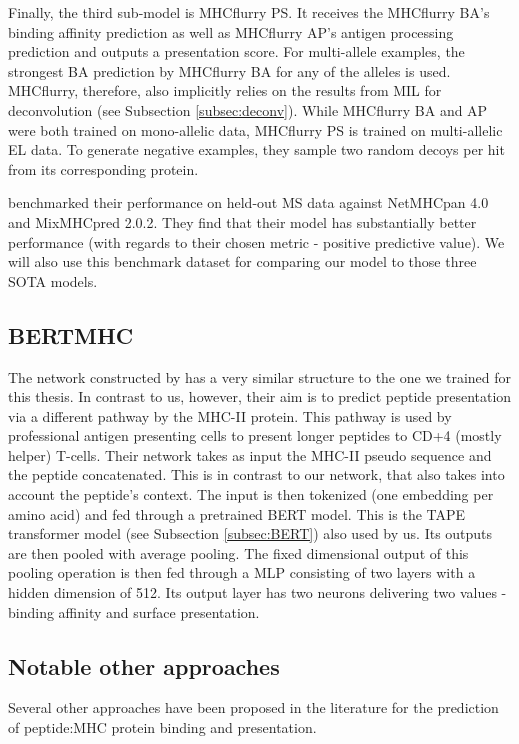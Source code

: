 \documentclass[msc,deptreport,ai]{infthesis} %
\begin{document}
	Finally, the third sub-model is MHCflurry PS. It receives the MHCflurry BA's binding affinity prediction as well as MHCflurry AP's antigen processing prediction and outputs a presentation score. For multi-allele examples, the strongest \gls{BA} prediction by MHCflurry BA for any of the alleles is used. MHCflurry, therefore, also implicitly relies on the results from \gls{MIL} for deconvolution (see Subsection \ref{subsec:deconv}). While MHCflurry BA and AP were both trained on mono-allelic data, MHCflurry PS is trained on multi-allelic \gls{EL} data. To generate negative examples, they sample two random decoys per hit from its corresponding protein.
	
	\cite{odonnell_mhcflurry_2020} benchmarked their performance on held-out MS data against NetMHCpan 4.0 and  MixMHCpred 2.0.2. They find that their model has substantially better performance (with regards to their chosen metric - positive predictive value). We will also use this benchmark dataset for comparing our model to those three \gls{SOTA} models. 
	
	\subsection{BERTMHC}
	\label{subsec:BERTMHC}
	The network constructed by \cite{cheng_bertmhc_2020} has a very similar structure to the one we trained for this thesis. In contrast to us, however, their aim is to predict peptide presentation via a different pathway by the \gls{MHC-II}  protein. This pathway is used by professional antigen presenting cells to present longer peptides to CD+4 (mostly helper) T-cells. Their network takes as input the \gls{MHC-II} pseudo sequence and the peptide concatenated. This is in contrast to our network, that also takes into account the peptide's context. The input is then tokenized (one embedding per amino acid) and fed through a pretrained \gls{BERT} model. This is the \gls{TAPE} transformer model (see Subsection \ref{subsec:BERT}) also used by us. Its outputs are then pooled with average pooling. The fixed dimensional output of this pooling operation is then fed through a \gls{MLP} consisting of two layers with a hidden dimension of 512. Its output layer has two neurons delivering two values - binding affinity and surface presentation. 
	
	\subsection{Notable other approaches}
	Several other approaches have been proposed in the literature for the prediction of peptide:MHC protein binding and presentation. 
	
\end{document}
